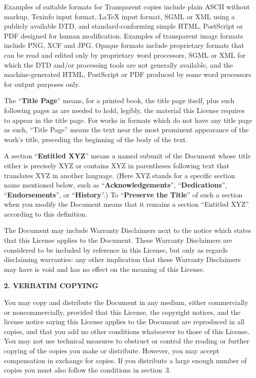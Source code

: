 \documentclass[11pt, openany]{book}
\theoremstyle{change} \theoremheaderfont{\blue\sffamily\bfseries}
\theoremstyle{nonumberplain} \theoremheaderfont{\sffamily\bfseries}
\newcommand{\í}{\'{\i}}
\begin{document}
{Examples of suitable formats for Transparent copies include plain
ASCII without markup, Texinfo input format, LaTeX input format, SGML
or XML using a publicly available DTD, and standard-conforming
simple HTML, PostScript or PDF designed for human modification.
Examples of transparent image formats include PNG, XCF and JPG.
Opaque formats include proprietary formats that can be read and
edited only by proprietary word processors, SGML or XML for which
the DTD and/or processing tools are not generally available, and the
machine-generated HTML, PostScript or PDF produced by some word
processors for output purposes only.

The ``\textbf{Title Page}'' means, for a printed book, the title
page itself, plus such following pages as are needed to hold,
legibly, the material this License requires to appear in the title
page.  For works in formats which do not have any title page as
such, ``Title Page'' means the text near the most prominent
appearance of the work's title, preceding the beginning of the body
of the text.

A section ``\textbf{Entitled XYZ}'' means a named subunit of the
Document whose title either is precisely XYZ or contains XYZ in
parentheses following text that translates XYZ in another language.
(Here XYZ stands for a specific section name mentioned below, such
as ``\textbf{Acknowledgements}'', ``\textbf{Dedications}'',
``\textbf{Endorsements}'', or ``\textbf{History}''.) To
``\textbf{Preserve the Title}'' of such a section when you modify
the Document means that it remains a section ``Entitled XYZ''
according to this definition.

The Document may include Warranty Disclaimers next to the notice
which states that this License applies to the Document.  These
Warranty Disclaimers are considered to be included by reference in
this License, but only as regards disclaiming warranties: any other
implication that these Warranty Disclaimers may have is void and has
no effect on the meaning of this License.


\begin{center}
{\Large\bf 2. VERBATIM COPYING\par} 
{}
\end{center}

You may copy and distribute the Document in any medium, either
commercially or noncommercially, provided that this License, the
copyright notices, and the license notice saying this License
applies to the Document are reproduced in all copies, and that you
add no other conditions whatsoever to those of this License.  You
may not use technical measures to obstruct or control the reading or
further copying of the copies you make or distribute.  However, you
may accept compensation in exchange for copies.  If you distribute a
large enough number of copies you must also follow the conditions in
section~3.

}
\end{document}
